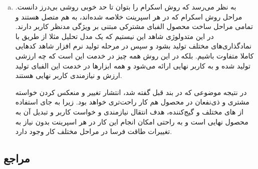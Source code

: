 {\begin{enumerate}[a)]
\begin{enumerate}
	\item محصول چهار چرخ دارد.
	\item محصول باید بتواند با سرعت حداقل ۲۰ کیلومتر در ساعت حرکت کند.
	\item محصول باید بتواند انسان و بار را جا به جا کند.
\end{enumerate}


در عوض در حالت ویژگی‌رانه این خودرو به صورت زیر توصیف می‌شود:

«به عنوان یک اپراتور وسایل نقلیه، نیاز به وسیله‌ای دارم که بتواند انسان و بار را با حداقل سرعت ۲۰ کیلومتر بر ساعت روی زمین جا به جا کند تا بتوانم محصولات و کشاورزان را جا به جا کنم.»

در حالت اول شاهد یک توصیف خیلی رسمی هستیم و با وجود این که ممکن است خروجی کار این سه ویژگی را داشته باشد، اما همچنان باب میل کاربر نهایی نباشد. در حالت دوم که مبتنی بر ویژگی است، نظر نهایی این که کاربر به چه چیزی نیاز دارد بیان شده است. انتشار تغییرات  در این حالت راحت‌تر صورت می‌گیرد و هر چند در حالت اول می‌توانیم ترجمه اولیه نیازمندی به محصول را به راحتی انجام بدهیم، ولی  بودن که در بخش‌های گذشته گفته شد و انتشار تغییر به راحتی صورت نمی‌گیرد. در نتیجه می‌توان گفت که این روش  نیست. هر چند همچنان ممکن است روش‌های نیازمندی-رانه‌ای وجود داشته باشند که با تغییراتی  شده باشند.

		\item
به نظر می‌رسد که روش اسکرام را بتوان تا حد خوبی روشی بی‌درز دانست. مراحل روش اسکرام که در هر اسپرینت خلاصه شده‌اند، به هم متصل هستند و تمامی مراحل ساخت محصول الفبای مشترکی مبتنی بر ویژگی مدنظر کاربر دارند. در این متدولوژی شاهد این نیستیم که یک مدل تحلیل مثلا از طریق  با نمادگذاری‌های مختلف تولید بشود و سپس در مرحله تولید نرم افزار شاهد کدهایی کاملا متفاوت باشیم. بلکه در این روش همه چیز در خدمت این است که چه ارزشی تولید شده و به کاربر نهایی ارائه می‌شود و همه ابزارها در خدمت این الفبای تولید ارزش و نیازمندی کاربر نهایی هستند.

در نتیجه موضوعی که در بند قبل گفته شد، انتشار تغییر و منعکس کردن خواسته مشتری و ذی‌نفعان در محصول هم کار راحت‌‌تری خواهد بود. زیرا به جای استفاده از  های مختلف و گیج‌کننده، هدف انتقال نیازمندی و خواست کاربر و تبدیل آن به محصول نهایی است و به راحتی امکان انجام این کار در هر اسپرینت بدون نیاز به تغییرات طاقت فرسا در مراحل مختلف کار وجود دارد.

	
	\end{enumerate}



\subsection*{مراجع}

}
